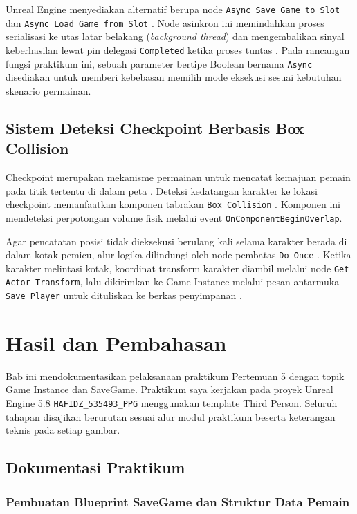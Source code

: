\documentclass[a4paper,oneside,12pt]{report}
\newcommand{\tocboldsection}[1]{%
  \protect\renewcommand{\protect\cftchapfont}{\protect\bfseries}%
  #1%
  \protect\renewcommand{\protect\cftchapfont}{}%
}
\begin{document}
Unreal Engine menyediakan alternatif berupa node \texttt{Async Save Game to Slot} dan \texttt{Async Load Game from Slot} \cite{epic-async}. Node asinkron ini memindahkan proses serialisasi ke utas latar belakang (\textit{background thread}) dan mengembalikan sinyal keberhasilan lewat pin delegasi \texttt{Completed} ketika proses tuntas \cite{modul5}. Pada rancangan fungsi praktikum ini, sebuah parameter bertipe Boolean bernama \texttt{Async} disediakan untuk memberi kebebasan memilih mode eksekusi sesuai kebutuhan skenario permainan.

\section{Sistem Deteksi Checkpoint Berbasis Box Collision}
Checkpoint merupakan mekanisme permainan untuk mencatat kemajuan pemain pada titik tertentu di dalam peta \cite{modul5}. Deteksi kedatangan karakter ke lokasi checkpoint memanfaatkan komponen tabrakan \texttt{Box Collision} \cite{epic-collision}. Komponen ini mendeteksi perpotongan volume fisik melalui event \texttt{OnComponentBeginOverlap}. 

Agar pencatatan posisi tidak dieksekusi berulang kali selama karakter berada di dalam kotak pemicu, alur logika dilindungi oleh node pembatas \texttt{Do Once} \cite{modul5}. Ketika karakter melintasi kotak, koordinat transform karakter diambil melalui node \texttt{Get Actor Transform}, lalu dikirimkan ke Game Instance melalui pesan antarmuka \texttt{Save Player} untuk dituliskan ke berkas penyimpanan \cite{modul5}.

\clearpage

\chapter[\tocboldsection{Hasil dan Pembahasan}]{Hasil dan Pembahasan}

Bab ini mendokumentasikan pelaksanaan praktikum Pertemuan 5 dengan topik Game Instance dan SaveGame. Praktikum saya kerjakan pada proyek Unreal Engine 5.8 \texttt{HAFIDZ\_535493\_PPG} menggunakan template Third Person. Seluruh tahapan disajikan berurutan sesuai alur modul praktikum beserta keterangan teknis pada setiap gambar.

\section{Dokumentasi Praktikum}

\subsection{Pembuatan Blueprint SaveGame dan Struktur Data Pemain}
\end{document}
